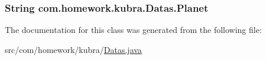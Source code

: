 \subsubsection[{\texorpdfstring{Planet}{Planet}}]{\setlength{\rightskip}{0pt plus 5cm}String com.\+homework.\+kubra.\+Datas.\+Planet\hspace{0.3cm}{\ttfamily [private]}}\hypertarget{classcom_1_1homework_1_1kubra_1_1_datas_aa640b8a7c100f4c8a34438bfd15bd5c1}{}\label{classcom_1_1homework_1_1kubra_1_1_datas_aa640b8a7c100f4c8a34438bfd15bd5c1}


The documentation for this class was generated from the following file\+:\begin{DoxyCompactItemize}
\item 
src/com/homework/kubra/\hyperlink{_datas_8java}{Datas.\+java}\end{DoxyCompactItemize}

